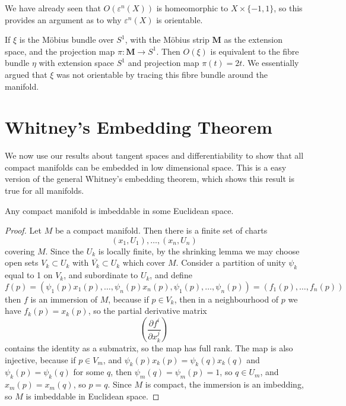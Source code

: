 \begin{example}
    We have already seen that $O(\varepsilon^n(X))$ is homeomorphic to $X \times \{ -1, 1 \}$, so this provides an argument as to why $\varepsilon^n(X)$ is orientable.
\end{example}

\begin{example}
    If $\xi$ is the M\"{o}bius bundle over $S^1$, with the M\"{o}bius strip $\mathbf{M}$ as the extension space, and the projection map $\pi: \mathbf{M} \to S^1$. Then $O(\xi)$ is equivalent to the fibre bundle $\eta$ with extension space $S^1$ and projection map $\pi(t) = 2t$. We essentially argued that $\xi$ was not orientable by tracing this fibre bundle around the manifold.
\end{example}

\section{Whitney's Embedding Theorem}

We now use our results about tangent spaces and differentiability to show that all compact manifolds can be embedded in low dimensional space. This is a easy version of the general Whitney's embedding theorem, which shows this result is true for all manifolds.

\begin{lemma}
    Any compact manifold is imbeddable in some Euclidean space.
\end{lemma}
\begin{proof}
    Let $M$ be a compact manifold. Then there is a finite set of charts
    \[ (x_1,U_1), \dots, (x_n,U_n) \]
    covering $M$. Since the $U_k$ is locally finite, by the shrinking lemma we may choose open sets $V_k \subset U_k$ with $\overline{V_k} \subset U_k$ which cover $M$. Consider a partition of unity $\psi_k$ equal to 1 on $V_k$, and subordinate to $U_k$, and define
    \[ f(p) = (\psi_1(p) x_1(p), \dots, \psi_n(p) x_n(p), \psi_1(p), \dots, \psi_n(p)) = (f_1(p), \dots, f_n(p)) \]
    then $f$ is an immersion of $M$, because if $p \in V_k$, then in a neighbourhood of $p$ we have $f_k(p) = x_k(p)$, so the partial derivative matrix
    \[ \left( \frac{\partial f^i}{\partial x_k^j} \right) \]
    contains the identity as a submatrix, so the map has full rank. The map is also injective, because if $p \in V_m$, and $\psi_k(p) x_k(p) = \psi_k(q) x_k(q)$ and $\psi_k(p) = \psi_k(q)$ for some $q$, then $\psi_m(q) = \psi_m(p) = 1$, so $q \in U_m$, and $x_m(p) = x_m(q)$, so $p = q$. Since $M$ is compact, the immersion is an imbedding, so $M$ is imbeddable in Euclidean space.
\end{proof}

